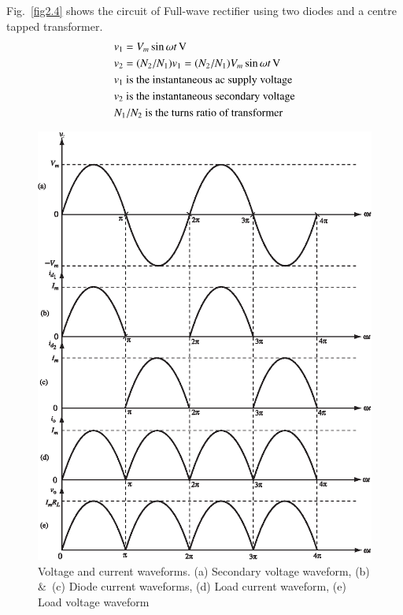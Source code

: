 Fig.~\ref{fig2.4} shows the circuit of Full-wave rectifier using two diodes and
a centre tapped transformer.
\begin{align*}
& v_1  = V_m \sin \omega t \operatorname{\mathrm{V}}\\
& v_2  = (N_2 / N_1) v_1 = (N_2 /N_1) V_m \sin \omega t \operatorname{\mathrm{V}}\\
& v_1 \text{ is the instantaneous ac supply voltage}\\
& v_2 \text{ is the instantaneous secondary voltage}\\
& N_1/N_2 \text{ is the turns ratio of transformer}
\end{align*}
\begin{figure}[H]
\centering
\includegraphics{chap2/add-fig/S3-EE-02-005.eps}
\caption{Voltage and current waveforms. (a) Secondary voltage waveform, (b) \&\ (c) Diode current waveforms, (d) Load current waveform, (e) Load voltage waveform}\label{fig2.5}
\end{figure}

\eject

